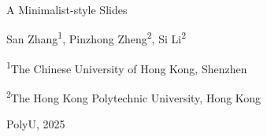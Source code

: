 \documentclass[8pt]{beamer}
\begin{document}
\sf







\begin{frame}[plain]

    \setlength{\parskip}{0.2em}
    \vspace{13mm}
    {\color{themecolor}\huge 
    A Minimalist-style Slides
    }


\vspace{7mm}

    {\large
    San Zhang\textsuperscript{1}, 
    {\color{themecolor!80!black} Pinzhong Zheng}\textsuperscript{2}, 
    Si Li\textsuperscript{2}
    }
    
\vspace{4mm}
    
    \textsuperscript{1}The Chinese University of Hong Kong, Shenzhen
    
    \textsuperscript{2}The Hong Kong Polytechnic University, Hong Kong

\vspace{4mm}

    {\small
    PolyU, 2025
    }



\end{frame}
\end{document}
